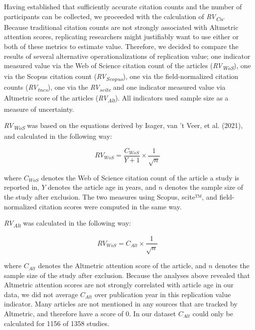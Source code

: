 \documentclass[
  man,floatsintext]{apa6}
\begin{document}
Having established that sufficiently accurate citation counts and the number of participants can be collected, we proceeded with the calculation of \emph{RV\textsubscript{Cn}}. Because traditional citation counts are not strongly associated with Altmetric attention scores, replicating researchers might justifiably want to use either or both of these metrics to estimate value. Therefore, we decided to compare the results of several alternative operationalizations of replication value; one indicator measured value via the Web of Science citation count of the articles (\emph{RV\textsubscript{WoS}}), one via the Scopus citation count (\emph{RV\textsubscript{Scopus}}), one via the field-normalized citation counts (\emph{RV\textsubscript{tncs}}), one via the \emph{RV\textsubscript{scite}} and one indicator measured value via Altmetric score of the articles (\emph{RV\textsubscript{Alt}}). All indicators used sample size as a measure of uncertainty.

\emph{RV\textsubscript{WoS}} was based on the equations derived by Isager, van 't Veer, et al. (2021), and calculated in the following way:

\begin{equation} 
  \tag{2}
  RV_{WoS} = \frac{C_{WoS}}{Y+1}\times\frac{1}{\sqrt{n}}
  \label{eq:2}
\end{equation}

where \(C_{WoS}\) denotes the Web of Science citation count of the article a study is reported in, \(Y\) denotes the article age in years, and \(n\) denotes the sample size of the study after exclusion. The two measures using Scopus, scite™, and field-normalized citation scores were computed in the same way.

\emph{RV\textsubscript{Alt}} was calculated in the following way:

\begin{equation} 
  \tag{3}
  RV_{WoS} = C_{Alt}\times\frac{1}{\sqrt{n}}
  \label{eq:3}
\end{equation}

where \(C_{Alt}\) denotes the Altmetric attention score of the article, and \(n\) denotes the sample size of the study after exclusion. Because the analyses above revealed that Altmetric attention scores are not strongly correlated with article age in our data, we did not average \(C_{Alt}\) over publication year in this replication value indicator. Many articles are not mentioned in any sources that are tracked by Altmetric, and therefore have a score of 0. In our dataset \(C_{Alt}\) could only be calculated for 1156 of 1358 studies.
\end{document}
